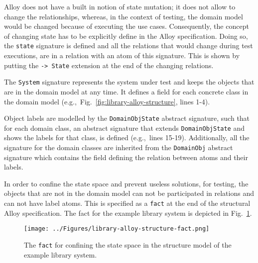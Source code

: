 Alloy does not have a built in notion of state mutation; it does not allow to change the relationships, whereas, in the context of testing, the domain model would be changed because of executing the use cases. Consequently, the concept of changing state has to be explicitly define in the Alloy specification. Doing so, the \texttt{state} signature is defined and all the relations that would change during test executions, are in a relation with an atom of this signature. This is shown by putting the \texttt{-> State} extension at the end of the changing relations.

The \texttt{System} signature represents the system under test and keeps the objects that are in the domain model at any time. It defines a field for each concrete class in the domain model (e.g.,\ Fig.~\ref{fig:library-alloy-structure}, lines 1-4).

Object labels are modelled by the \texttt{DomainObjState} abstract signature, such that for each domain class, an abstract signature that extends \texttt{DomainObjState} and shows the labels for that class, is defined (e.g.,\ lines 15-19). Additionally, all the signature for the domain classes are inherited from the \texttt{DomainObj} abstract signature which contains the field defining the relation between atoms and their labels.

In order to confine the state space and prevent useless solutions, for testing, the objects that are not in the domain model can not be participated in relations and can not have label atoms. This is specified as a \texttt{fact} at the end of the structural Alloy specification. The fact for the example library system is depicted in Fig.~\ref{fig:library-alloy-structure-fact}.

\begin{figure}[h]
\centering
\texttt{[image: ../Figures/library-alloy-structure-fact.png]}
\caption{The \texttt{fact} for confining the state space in the structure model of the example library system.}
\label{fig:library-alloy-structure-fact}
\end{figure}


